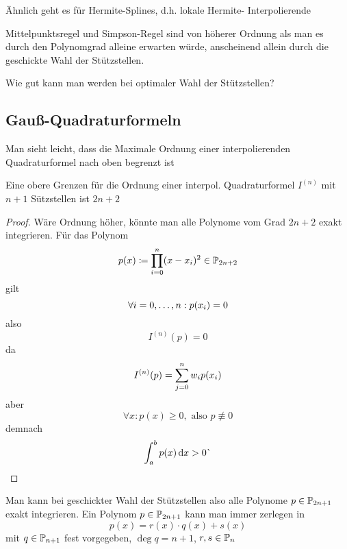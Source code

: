 \documentclass[11pt,a4paper,oneside]{scrartcl}
\begin{document}
\begin{remark}
    Ähnlich geht es für Hermite-Splines, d.h. lokale Hermite-
    Interpolierende
\end{remark}
\begin{motivation}
    Mittelpunktsregel und Simpson-Regel sind von höherer Ordnung als 
    man es durch 
    den Polynomgrad alleine erwarten würde, anscheinend allein durch 
    die 
    geschickte Wahl der Stützstellen. 
\end{motivation}
\begin{question}
    Wie gut kann man werden bei optimaler Wahl der Stützstellen?
\end{question}
\subsection{Gauß-Quadraturformeln}
Man sieht leicht, dass die Maximale Ordnung einer interpolierenden 
Quadraturformel nach oben begrenzt ist
\begin{lemma}
    Eine obere Grenzen für die Ordnung einer interpol. Quadraturformel 
    $I^{(n)}$ 
    mit $n+1$ Sützstellen ist $2n+2$
\end{lemma}
\begin{proof}
    Wäre Ordnung höher, könnte man alle Polynome vom Grad $2n+2$ exakt 
    integrieren. Für das Polynom \[
        p(x) \coloneqq \prod_{i=0}^n(x-x_i)^2 \in \mathbb{P}_{2n+2}
    \]
    gilt \[
    \forall i = 0,\dots, n: p(x_i) = 0
    \]
    also \[
        I^{(n)}(p) = 0
    \]
    da \[
        I^{(n)}(p) = \displaystyle\sum_{j=0}^n w_ip(x_i)
    \]
    aber \[
    \forall x: p(x) \geq 0, \text{ also }p\not\equiv 0
    \]
    demnach \[
        \int_a^b p(x)\mathop{}\!\mathrm{d} x > 0 \lightning
    \]    
\end{proof}
Man kann bei geschickter Wahl der Stützstellen also alle Polynome $p\in\mathbb{P}_{2n+1}$ exakt integrieren.
Ein Polynom $p\in\mathbb{P}_{2n+1}$ kann man immer zerlegen in \[
    p(x) = r(x) \cdot q(x) + s(x)\]
mit $q\in \mathbb{P}_{n+1}$ fest vorgegeben, $\deg{q} = n+1$, $r,s\in \mathbb{P}_n$
\end{document}
